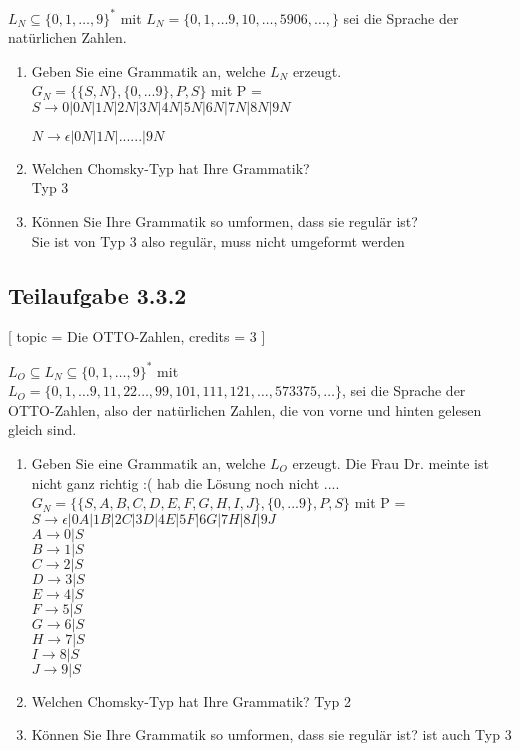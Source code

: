 \documentclass[12pt]{article}
\begin{document}
 $L_N \subseteq \{0,1,\ldots,9\}^*$ mit $L_N = \{0, 1, \ldots 9, 10, \ldots, 5906, \ldots, \}$ sei die Sprache der natürlichen Zahlen. 
 \begin{enumerate} 
 \item Geben Sie eine Grammatik an, welche $L_N$ erzeugt.  
 \\
 $G_N = \{\{S,N\},\{0,...9\},P,S\}$ mit P =\\
 
 $S \rightarrow 0|0N|1N|2N|3N|4N|5N|6N|7N|8N|9N$
 
 $N \rightarrow \epsilon|0N|1N|......|9N$
 \item Welchen Chomsky-Typ hat Ihre Grammatik? \\
 Typ 3
 \item Können Sie Ihre Grammatik so umformen, dass sie regulär ist? \\
 Sie ist von Typ 3 also regulär, muss nicht umgeformt werden
 \end{enumerate}  
  
  
  
  
 \subsection*{Teilaufgabe 3.3.2} [ 
 topic = Die OTTO-Zahlen, 
 credits = 3 
 ] 
  
 $L_O \subseteq L_N \subseteq \{0,1,\ldots,9\}^*$ mit $L_O = \{0, 1, \ldots 9, 11, 22 \ldots , 99, 101, 111, 121, \ldots , 573375, \ldots \}$, sei die Sprache der OTTO-Zahlen, also der natürlichen Zahlen, die von vorne und hinten gelesen gleich sind. 
 \begin{enumerate} 
 \item Geben Sie eine Grammatik an, welche $L_O$ erzeugt. 
 Die Frau Dr. meinte ist nicht ganz richtig :( hab die Lösung noch nicht ....
 $G_N = \{\{S,A,B,C,D,E,F,G,H,I,J\},\{0,...9\},P,S\}$ mit P =\\
 $S \rightarrow \epsilon|0A|1B|2C|3D|4E|5F|6G|7H|8I|9J$\\
 $A \rightarrow 0 | S$\\
 $B \rightarrow 1 | S$\\
 $C \rightarrow 2 | S$\\
 $D \rightarrow 3 | S$\\
 $E \rightarrow 4 | S$\\
 $F \rightarrow 5 | S$\\
 $G \rightarrow 6 | S$\\
 $H \rightarrow 7 | S$\\
 $I \rightarrow 8 | S$\\
 $J \rightarrow 9 | S$ 
 \item Welchen Chomsky-Typ hat Ihre Grammatik? 
 Typ 2
 \item Können Sie Ihre Grammatik so umformen, dass sie regulär ist? 
 ist auch Typ 3
 \end{enumerate}  
  
  
 
\end{document}
